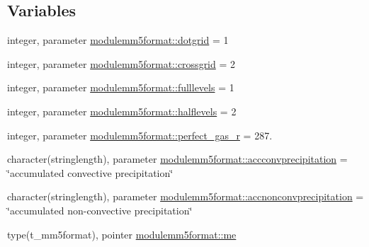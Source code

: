 \subsection*{Variables}
\begin{DoxyCompactItemize}
\item 
integer, parameter \mbox{\hyperlink{namespacemodulemm5format_a871b844ed6929a6562485e2a29d28989}{modulemm5format\+::dotgrid}} = 1
\item 
integer, parameter \mbox{\hyperlink{namespacemodulemm5format_a8eb6f7aafd2e1d54d8df38612f563472}{modulemm5format\+::crossgrid}} = 2
\item 
integer, parameter \mbox{\hyperlink{namespacemodulemm5format_a86c89b8f5d82abe380899e8a735d9a04}{modulemm5format\+::fulllevels}} = 1
\item 
integer, parameter \mbox{\hyperlink{namespacemodulemm5format_acc9d4a4df78416271fbe07dc0b298995}{modulemm5format\+::halflevels}} = 2
\item 
integer, parameter \mbox{\hyperlink{namespacemodulemm5format_af8de31546878abb803b899a68d6b863c}{modulemm5format\+::perfect\+\_\+gas\+\_\+r}} = 287.
\item 
character(stringlength), parameter \mbox{\hyperlink{namespacemodulemm5format_a101bf0aa4a9ab5456ed7d19dc05bd796}{modulemm5format\+::accconvprecipitation}} = \char`\"{}accumulated convective precipitation\char`\"{}
\item 
character(stringlength), parameter \mbox{\hyperlink{namespacemodulemm5format_ad160a358d9d8a90c1e91557493fd9482}{modulemm5format\+::accnonconvprecipitation}} = \char`\"{}accumulated non-\/convective precipitation\char`\"{}
\item 
type(t\+\_\+mm5format), pointer \mbox{\hyperlink{namespacemodulemm5format_ae4f84fc3add37ecb0c20b09a854afc4f}{modulemm5format\+::me}}
\end{DoxyCompactItemize}
